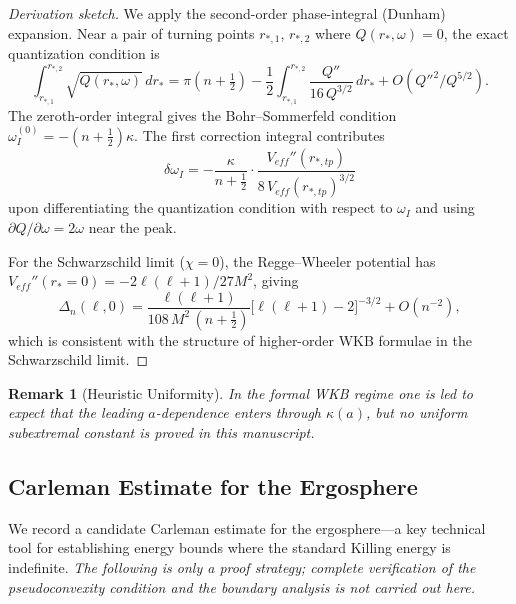 \documentclass[12pt,a4paper]{article}
\newtheorem{remark}[theorem]{Remark}
\begin{document}
\begin{proof}[Derivation sketch]
We apply the second-order phase-integral (Dunham) expansion. Near a pair of turning points $r_{*,1}$, $r_{*,2}$ where $Q(r_*,\omega)=0$, the exact quantization condition is
\begin{equation}
\int_{r_{*,1}}^{r_{*,2}} \sqrt{Q(r_*,\omega)}\,dr_*
= \pi\!\left(n+\tfrac{1}{2}\right)
  - \frac{1}{2}\int_{r_{*,1}}^{r_{*,2}}
    \frac{Q''}{16\,Q^{3/2}}\,dr_*
  + O(Q''^2/Q^{5/2}).
\end{equation}
The zeroth-order integral gives the Bohr--Sommerfeld condition $\omega_I^{(0)} = -(n+\frac{1}{2})\kappa$. The first correction integral contributes
\begin{equation}
\delta\omega_I
= -\frac{\kappa}{n+\frac{1}{2}}
  \cdot\frac{V_{eff}''(r_{*,tp})}{8\,V_{eff}(r_{*,tp})^{3/2}}
\end{equation}
upon differentiating the quantization condition with respect to $\omega_I$ and using $\partial Q/\partial\omega = 2\omega$ near the peak.

For the Schwarzschild limit ($\chi=0$), the Regge--Wheeler potential has $V_{eff}''(r_*=0) = -2\ell(\ell+1)/27M^2$, giving
\begin{equation}
\Delta_n(\ell, 0)
= \frac{\ell(\ell+1)}{108\,M^2\,(n+\frac{1}{2})}
  \bigl[\ell(\ell+1)-2\bigr]^{-3/2}
  + O(n^{-2}),
\end{equation}
which is consistent with the structure of higher-order WKB formulae in the Schwarzschild limit.
\end{proof}

\begin{remark}[Heuristic Uniformity]
In the formal WKB regime one is led to expect that the leading $a$-dependence enters through $\kappa(a)$, but no uniform subextremal constant is proved in this manuscript.
\end{remark}

\subsection{Carleman Estimate for the Ergosphere}

We record a candidate Carleman estimate for the ergosphere---a key technical tool for establishing energy bounds where the standard Killing energy is indefinite. \textit{The following is only a proof strategy; complete verification of the pseudoconvexity condition and the boundary analysis is not carried out here.}
\end{document}
